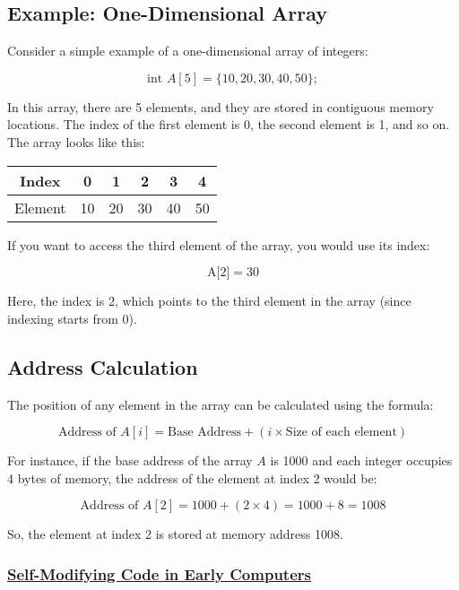 \documentclass{book}
\begin{document}
	\subsection{Example: One-Dimensional Array}
	
	Consider a simple example of a one-dimensional array of integers:
	
	\[\text{int } A[5] = \{10, 20, 30, 40, 50\};\]
	
	In this array, there are 5 elements, and they are stored in contiguous memory locations. The index of the first element is 0, the second element is 1, and so on. The array looks like this:
	
	\begin{center}
    		\begin{tabular}{|c|c|c|c|c|c|}
			\hline
				Index & 0 & 1 & 2 & 3 & 4 \\
			\hline
			Element & 10 & 20 & 30 & 40 & 50 \\
			\hline
			\end{tabular}
	\end{center}
	
	If you want to access the third element of the array, you would use its index:
	
	\[\text{A[2]} = 30\]
	
	Here, the index is 2, which points to the third element in the array (since indexing starts from 0). 
	
	\subsection{Address Calculation}
	
	The position of any element in the array can be calculated using the formula:
	
	\[\text{Address of } A[i] = \text{Base Address} + (i \times \text{Size of each element})\]
	
	For instance, if the base address of the array \( A \) is 1000 and each integer occupies 4 bytes of memory, the address of the element at index 2 would be:
	
	\[\text{Address of } A[2] = 1000 + (2 \times 4) = 1000 + 8 = 1008\]
	
	So, the element at index 2 is stored at memory address 1008.
	
	\subsubsection{\href{https://en.wikipedia.org/wiki/Self-modifying_code}{Self-Modifying Code in Early Computers}}
	
\end{document}
